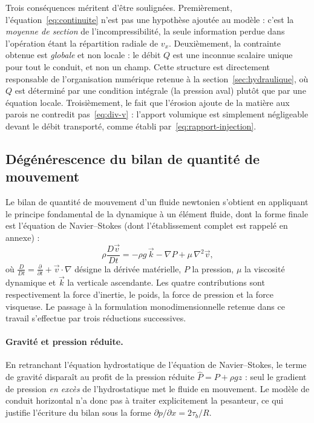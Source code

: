 \documentclass[11pt,a4paper]{report}
\newcommand{\Chat}{\hat{P}}
\begin{document}
Trois conséquences méritent d'être soulignées. Premièrement, l'équation~\eqref{eq:continuite} n'est pas
une hypothèse ajoutée au modèle : c'est la \emph{moyenne de section} de l'incompressibilité, la seule
information perdue dans l'opération étant la répartition radiale de \(v_x\). Deuxièmement, la contrainte
obtenue est \emph{globale} et non locale : le débit \(Q\) est une inconnue scalaire unique pour tout le
conduit, et non un champ. Cette structure est directement responsable de l'organisation numérique
retenue à la section~\ref{sec:hydraulique}, où \(Q\) est déterminé par une condition intégrale
(la pression aval) plutôt que par une équation locale. Troisièmement, le fait que l'érosion ajoute de la
matière aux parois ne contredit pas~\eqref{eq:div-v} : l'apport volumique est simplement négligeable
devant le débit transporté, comme établi par~\eqref{eq:rapport-injection}.

\subsection{Dégénérescence du bilan de quantité de mouvement}
\label{sec:degenerescence}

Le bilan de quantité de mouvement d'un fluide newtonien s'obtient en appliquant le principe fondamental
de la dynamique à un élément fluide, dont la forme finale est l'équation de Navier--Stokes
(dont l'établissement complet est rappelé en annexe) :
\begin{equation}
\rho\frac{D\vec{v}}{Dt} = -\rho g\,\vec{k} - \nabla P + \mu\,\nabla^2\vec{v},
\label{eq:ns}
\end{equation}
où \(\frac{D}{Dt}=\frac{\partial}{\partial t}+\vec{v}\cdot\nabla\) désigne la dérivée matérielle, \(P\) la
pression, \(\mu\) la viscosité dynamique et \(\vec{k}\) la verticale ascendante. Les quatre contributions
sont respectivement la force d'inertie, le poids, la force de pression et la force visqueuse. Le passage
à la formulation monodimensionnelle retenue dans ce travail s'effectue par trois réductions successives.

\paragraph{Gravité et pression réduite.} En retranchant l'équation hydrostatique de l'équation de
Navier--Stokes, le terme de gravité disparaît au profit de la pression réduite
\(\Chat = P + \rho g z\) : seul le gradient de pression \emph{en excès} de l'hydrostatique met le fluide
en mouvement. Le modèle de conduit horizontal n'a donc pas à traiter explicitement la pesanteur, ce qui
justifie l'écriture du bilan sous la forme \(\partial p/\partial x = 2\tau_b/R\).
\end{document}
